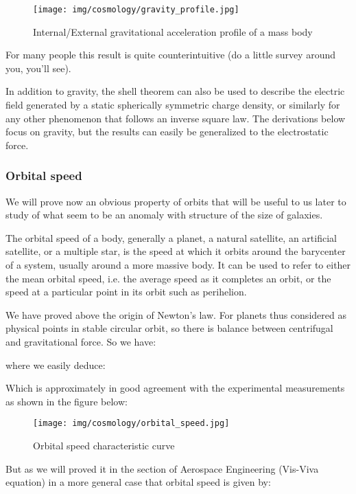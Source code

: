 	\begin{figure}[H]
		\begin{center}
		\texttt{[image: img/cosmology/gravity\_profile.jpg]}
		\end{center}	
		\caption{Internal/External gravitational acceleration profile of a mass body}
	\end{figure}

	For many people this result is quite counterintuitive (do a little survey around you, you'll see).
	
	\begin{tcolorbox}[title=Remark,colframe=black,arc=10pt]
	In addition to gravity, the shell theorem can also be used to describe the electric field generated by a static spherically symmetric charge density, or similarly for any other phenomenon that follows an inverse square law. The derivations below focus on gravity, but the results can easily be generalized to the electrostatic force. 
	\end{tcolorbox}
	
	\subsubsection{Orbital speed}
	We will prove now an obvious property of orbits that will be useful to us later to study of what seem to be an anomaly with structure of the size of galaxies.
	
	The orbital speed of a body, generally a planet, a natural satellite, an artificial satellite, or a multiple star, is the speed at which it orbits around the barycenter of a system, usually around a more massive body. It can be used to refer to either the mean orbital speed, i.e. the average speed as it completes an orbit, or the speed at a particular point in its orbit such as perihelion.
	
	We have proved above the origin of Newton's law. For planets thus considered as physical points in stable circular orbit, so there is balance between centrifugal and gravitational force. So we have:
	
	where we easily deduce:
	
	Which is approximately in good agreement with the experimental measurements as shown in the figure below:
	\begin{figure}[H]
		\begin{center}
		\texttt{[image: img/cosmology/orbital\_speed.jpg]}
		\end{center}	
		\caption{Orbital speed characteristic curve}
	\end{figure}
	But as we will proved it in the section of Aerospace Engineering (Vis-Viva equation) in a more general case that orbital speed is given by:
	
